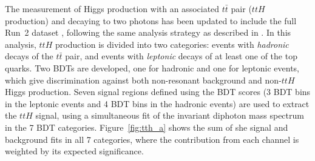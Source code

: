 \documentclass{moriond}
\begin{document}
The measurement of Higgs production with an associated $t\bar t$ pair ($ttH$ production) and decaying
to two photons has been updated to include the full Run~2 dataset \cite{ATLAS-CONF-2019-004},
following the same analysis strategy as described in \cite{Aaboud:2018urx}. In this analysis, $ttH$ production is
divided into two categories: events with {\itshape hadronic} decays of the $t\bar t$ pair, and
events with {\itshape leptonic} decays of at least one of the top quarks. Two BDTs are developed, one
for hadronic and one for leptonic events, which give discrimination against both non-resonant
background and non-$ttH$ Higgs production. Seven signal regions defined using the BDT scores
(3 BDT bins in the leptonic events and 4 BDT bins in the hadronic events) are used to extract the $ttH$
signal,
using a simultaneous fit of the invariant diphoton mass spectrum in the 7 BDT categories.
Figure~\ref{fig:tth_a} shows the sum of she signal and background fits in all 7 categories, where
the contribution from each channel is weighted by its expected significance.
\end{document}
